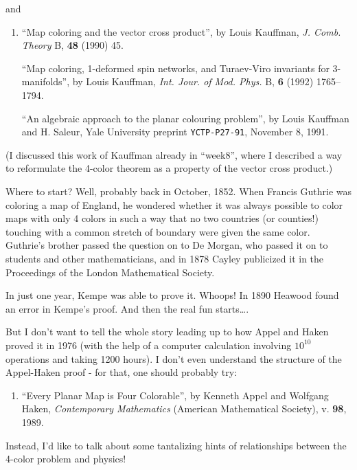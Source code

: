 \documentclass{article}
\def\tightlist{}
\begin{document}
and

\begin{enumerate}
\def\labelenumi{\arabic{enumi})}
\setcounter{enumi}{1}
\item
  ``Map coloring and the vector cross product'', by Louis Kauffman,
  \emph{J. Comb. Theory} B, \textbf{48} (1990) 45.

  ``Map coloring, 1-deformed spin networks, and Turaev-Viro invariants
  for 3-manifolds'', by Louis Kauffman, \emph{Int. Jour. of Mod. Phys.}
  B, \textbf{6} (1992) 1765--1794.

  ``An algebraic approach to the planar colouring problem'', by Louis
  Kauffman and H. Saleur, Yale University preprint \texttt{YCTP-P27-91},
  November 8, 1991.
\end{enumerate}

(I discussed this work of Kauffman already in ``week8'', where I
described a way to reformulate the 4-color theorem as a property of the
vector cross product.)

Where to start? Well, probably back in October, 1852. When Francis
Guthrie was coloring a map of England, he wondered whether it was always
possible to color maps with only 4 colors in such a way that no two
countries (or counties!) touching with a common stretch of boundary were
given the same color. Guthrie's brother passed the question on to De
Morgan, who passed it on to students and other mathematicians, and in
1878 Cayley publicized it in the Proceedings of the London Mathematical
Society.

In just one year, Kempe was able to prove it. Whoops! In 1890 Heawood
found an error in Kempe's proof. And then the real fun starts\ldots.

But I don't want to tell the whole story leading up to how Appel and
Haken proved it in 1976 (with the help of a computer calculation
involving \(10^10\) operations and taking 1200 hours). I don't even
understand the structure of the Appel-Haken proof - for that, one should
probably try:

\begin{enumerate}
\def\labelenumi{\arabic{enumi})}
\setcounter{enumi}{2}
\tightlist
\item
  ``Every Planar Map is Four Colorable'', by Kenneth Appel and Wolfgang
  Haken, \emph{Contemporary Mathematics} (American Mathematical
  Society), v. \textbf{98}, 1989.
\end{enumerate}

Instead, I'd like to talk about some tantalizing hints of relationships
between the 4-color problem and physics!
\end{document}
